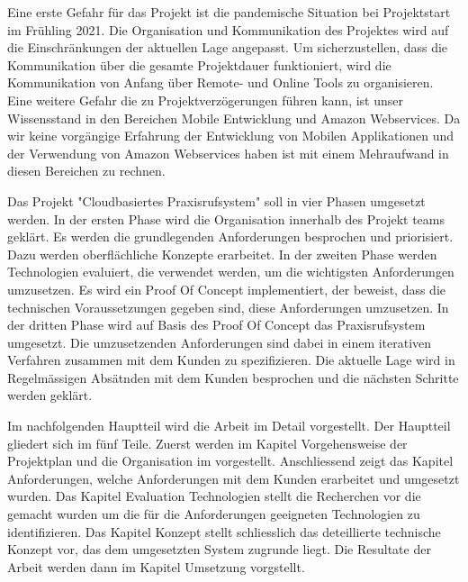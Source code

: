 Eine erste Gefahr für das Projekt ist die pandemische Situation bei Projektstart im Frühling 2021.
Die Organisation und Kommunikation des Projektes wird auf die Einschränkungen der aktuellen Lage angepasst.
Um sicherzustellen, dass die Kommunikation über die gesamte Projektdauer funktioniert, wird die Kommunikation von Anfang über Remote- und Online Tools zu organisieren.
Eine weitere Gefahr die zu Projektverzögerungen führen kann, ist unser Wissensstand in den Bereichen Mobile Entwicklung und Amazon Webservices.
Da wir keine vorgängige Erfahrung der Entwicklung von Mobilen Applikationen und der Verwendung von Amazon Webservices haben ist mit einem Mehraufwand in diesen Bereichen zu rechnen.

Das Projekt "Cloudbasiertes Praxisrufsystem" soll in vier Phasen umgesetzt werden.
In der ersten Phase wird die Organisation innerhalb des Projekt teams geklärt.
Es werden die grundlegenden Anforderungen besprochen und priorisiert.
Dazu werden oberflächliche Konzepte erarbeitet.
In der zweiten Phase werden Technologien evaluiert, die verwendet werden, um die wichtigsten Anforderungen umzusetzen.
Es wird ein Proof Of Concept implementiert, der beweist, dass die technischen Voraussetzungen gegeben sind, diese Anforderungen umzusetzen.
In der dritten Phase wird auf Basis des Proof Of Concept das Praxisrufsystem umgesetzt.
Die umzusetzenden Anforderungen sind dabei in einem iterativen Verfahren zusammen mit dem Kunden zu spezifizieren.
Die aktuelle Lage wird in Regelmässigen Absätnden mit dem Kunden besprochen und die nächsten Schritte werden geklärt.

Im nachfolgenden Hauptteil wird die Arbeit im Detail vorgestellt.
Der Hauptteil gliedert sich im fünf Teile.
Zuerst werden im Kapitel Vorgehensweise der Projektplan und die Organisation im vorgestellt.
Anschliessend zeigt das Kapitel Anforderungen, welche Anforderungen mit dem Kunden erarbeitet und umgesetzt wurden.
Das Kapitel Evaluation Technologien stellt die Recherchen vor die gemacht wurden um die für die Anforderungen geeigneten Technologien zu identifizieren.
Das Kapitel Konzept stellt schliesslich das deteillierte technische Konzept vor, das dem umgesetzten System zugrunde liegt.
Die Resultate der Arbeit werden dann im Kapitel Umsetzung vorgstellt.


\clearpage
